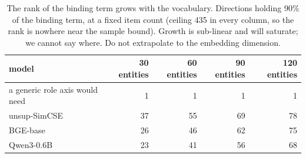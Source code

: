 \begin{table}[t]
\centering
\small
\caption{The rank of the binding term grows with the vocabulary. Directions holding 90\% of the binding term, at a fixed item count (ceiling 435 in every column, so the rank is nowhere near the sample bound). Growth is sub-linear and will saturate; we cannot say where. Do not extrapolate to the embedding dimension.}
\begin{tabular}{lrrrr}
\toprule
model & 30 entities & 60 entities & 90 entities & 120 entities \\
\midrule
a generic role axis would need & 1 & 1 & 1 & 1 \\
unsup-SimCSE & 37 & 55 & 69 & 78 \\
BGE-base & 26 & 46 & 62 & 75 \\
Qwen3-0.6B & 23 & 41 & 56 & 68 \\
\bottomrule
\end{tabular}
\end{table}

